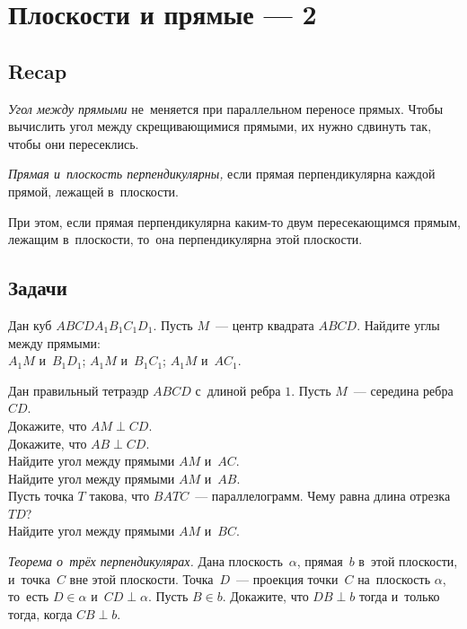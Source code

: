 
\section*{Плоскости и прямые --- 2}

\subsection*{Recap}

\emph{Угол между прямыми} не~меняется при параллельном переносе прямых.
Чтобы вычислить угол между скрещивающимися прямыми, их нужно сдвинуть так,
чтобы они пересеклись.

\emph{Прямая и~плоскость перпендикулярны,} если прямая перпендикулярна каждой
прямой, лежащей в~плоскости.

При этом, если прямая перпендикулярна каким-то двум пересекающимся прямым,
лежащим в~плоскости, то~она перпендикулярна этой плоскости.

\subsection*{Задачи}

\begin{problems}

\item
Дан куб $A B C D A_1 B_1 C_1 D_1$.
Пусть $M$~--- центр квадрата $ABCD$.
Найдите углы между прямыми:
\\
\subproblem
$A_1 M$ и~$B_1 D_1$;
\qquad
\subproblem
$A_1 M$ и~$B_1 C_1$;
\qquad
\subproblem
$A_1 M$ и~$A C_1$.

\item
Дан правильный тетраэдр $ABCD$ с~длиной ребра $1$.
Пусть $M$~--- середина ребра~$CD$.
\\
\subproblem
Докажите, что $AM \perp CD$.
\\
\subproblem
Докажите, что $AB \perp CD$.
\\
\subproblem
Найдите угол между прямыми $AM$ и~$AC$.
\\
\subproblem
Найдите угол между прямыми $AM$ и~$AB$.
\\
\subproblem
Пусть точка $T$ такова, что $BATC$~--- параллелограмм.
Чему равна длина отрезка~$TD$?
\\
\subproblem
Найдите угол между прямыми $AM$ и~$BC$.

\item \emph{Теорема о~трёх перпендикулярах.}
Дана плоскость~$\alpha$, прямая~$b$ в~этой плоскости, и~точка~$C$ вне этой
плоскости.
Точка~$D$~--- проекция точки~$C$ на~плоскость $\alpha$, то~есть $D \in \alpha$
и~$CD \perp \alpha$.
Пусть $B \in b$.
Докажите, что $DB \perp b$ тогда и~только тогда, когда $CB \perp b$.

\end{problems}

